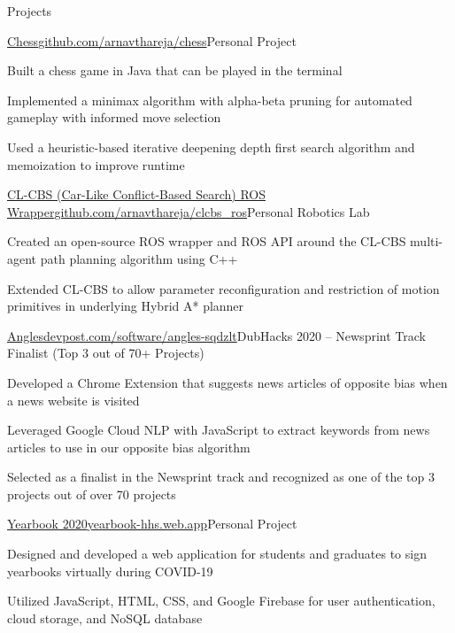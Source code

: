 \documentclass{resume} %
\begin{document}

\begin{rSection}{Projects}

\begin{project}{\href{https://github.com/arnavthareja/chess}{Chess}}{\href{https://github.com/arnavthareja/chess}{github.com/arnavthareja/chess}}{Personal Project}
\item Built a chess game in Java that can be played in the terminal
\item Implemented a minimax algorithm with alpha-beta pruning for automated gameplay with informed move selection
\item Used a heuristic-based iterative deepening depth first search algorithm and memoization to improve runtime
\end{project}

\begin{project}{\href{https://github.com/arnavthareja/clcbs\_ros}{CL-CBS (Car-Like Conflict-Based Search) ROS Wrapper}}{\href{https://github.com/arnavthareja/clcbs\_ros}{github.com/arnavthareja/clcbs\_ros}}{Personal Robotics Lab}
\item Created an open-source ROS wrapper and ROS API around the CL-CBS multi-agent path planning algorithm using C++
\item Extended CL-CBS to allow parameter reconfiguration and restriction of motion primitives in underlying Hybrid A* planner
\end{project}

\begin{project}{\href{https://devpost.com/software/angles-sqdzlt}{Angles}}{\href{https://devpost.com/software/angles-sqdzlt}{devpost.com/software/angles-sqdzlt}}{DubHacks 2020 – Newsprint Track Finalist (Top 3 out of 70+ Projects)}
\item Developed a Chrome Extension that suggests news articles of opposite bias when a news website is visited
\item Leveraged Google Cloud NLP with JavaScript to extract keywords from news articles to use in our opposite bias algorithm
\item Selected as a finalist in the Newsprint track and recognized as one of the top 3 projects out of over 70 projects
\end{project}

\begin{project}{\href{https://yearbook-hhs.web.app/}{Yearbook 2020}}{\href{https://yearbook-hhs.web.app/}{yearbook-hhs.web.app}}{Personal Project}
\item Designed and developed a web application for students and graduates to sign yearbooks virtually during COVID-19
\item Utilized JavaScript, HTML, CSS, and Google Firebase for user authentication, cloud storage, and NoSQL database
\end{project}

\end{rSection}
\end{document}
